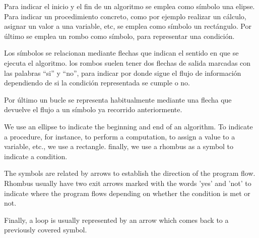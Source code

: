 \begin{paracol}{2}
Para indicar el inicio y el fin de un algoritmo se emplea como símbolo una elipse. Para indicar un procedimiento concreto, como por ejemplo realizar un cálculo, asignar un valor a una variable, etc, se emplea como símbolo un rectángulo. Por último se emplea un rombo como símbolo, para representar una condición.

Los símbolos se relacionan mediante flechas que indican el sentido en que se ejecuta el algoritmo. los rombos suelen tener dos flechas de salida marcadas con las palabras ``si'' y ``no'', para indicar por donde sigue el flujo de información dependiendo de si la condición representada se cumple o no.

Por último un bucle se representa habitualmente mediante una flecha que devuelve el flujo a un símbolo ya recorrido anteriormente.

\switchcolumn
We use an ellipse to indicate the beginning and end of an algorithm. To indicate a procedure, for instance, to perform a computation, to assign a value to a variable, etc., we use a rectangle. finally, we use a rhombus as a symbol to indicate a condition. 

The symbols are related by arrows to establish the direction of the program flow. Rhombus usually have two exit arrows marked with the words 'yes' and 'not' to indicate where the program flows depending on whether the condition is met or not.

Finally, a loop is usually represented by an arrow which comes back to a previously covered symbol. 
\end{paracol}
 


